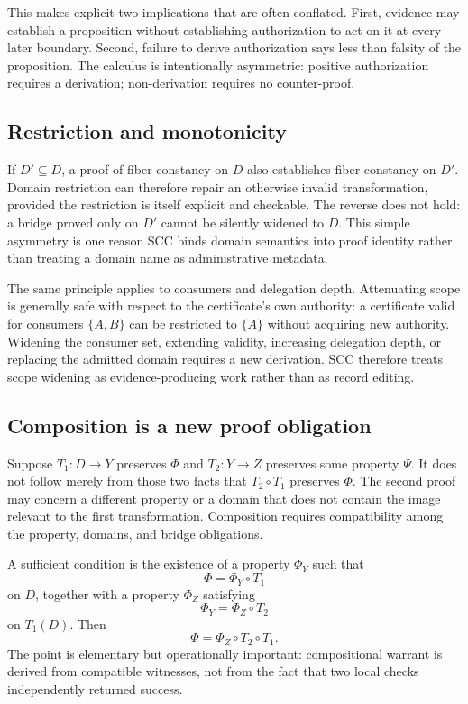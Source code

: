 \documentclass[11pt]{article}
\begin{document}
This makes explicit two implications that are often conflated. First, evidence may establish a proposition without establishing authorization to act on it at every later boundary. Second, failure to derive authorization says less than falsity of the proposition. The calculus is intentionally asymmetric: positive authorization requires a derivation; non-derivation requires no counter-proof.

\subsection{Restriction and monotonicity}
If $D'\subseteq D$, a proof of fiber constancy on $D$ also establishes fiber constancy on $D'$. Domain restriction can therefore repair an otherwise invalid transformation, provided the restriction is itself explicit and checkable. The reverse does not hold: a bridge proved only on $D'$ cannot be silently widened to $D$. This simple asymmetry is one reason SCC binds domain semantics into proof identity rather than treating a domain name as administrative metadata.

The same principle applies to consumers and delegation depth. Attenuating scope is generally safe with respect to the certificate's own authority: a certificate valid for consumers $\{A,B\}$ can be restricted to $\{A\}$ without acquiring new authority. Widening the consumer set, extending validity, increasing delegation depth, or replacing the admitted domain requires a new derivation. SCC therefore treats scope widening as evidence-producing work rather than as record editing.

\subsection{Composition is a new proof obligation}
Suppose $T_1:D\to Y$ preserves $\Phi$ and $T_2:Y\to Z$ preserves some property $\Psi$. It does not follow merely from those two facts that $T_2\circ T_1$ preserves $\Phi$. The second proof may concern a different property or a domain that does not contain the image relevant to the first transformation. Composition requires compatibility among the property, domains, and bridge obligations.

A sufficient condition is the existence of a property $\Phi_Y$ such that
\[
\Phi=\Phi_Y\circ T_1
\]
on $D$, together with a property $\Phi_Z$ satisfying
\[
\Phi_Y=\Phi_Z\circ T_2
\]
on $T_1(D)$. Then
\[
\Phi=\Phi_Z\circ T_2\circ T_1.
\]
The point is elementary but operationally important: compositional warrant is derived from compatible witnesses, not from the fact that two local checks independently returned success.
\end{document}
